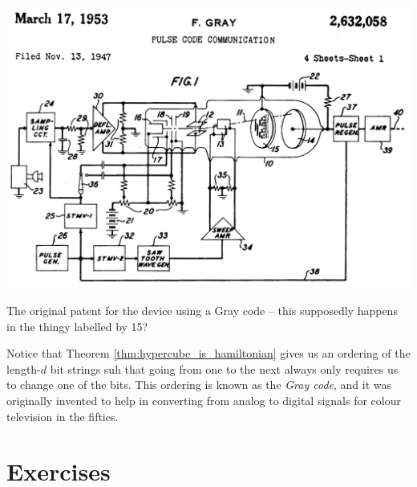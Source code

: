 \documentclass[nobib]{tufte-handout}
\begin{document}
\begin{marginfigure}
    \centering
    \includegraphics[width=1.0\textwidth]{graphics/L8_vx_covers_hamiltonicity_etc/gray_code_patent.png}
    \caption{The original patent for the device using a Gray code -- this supposedly happens in the thingy labelled by 15?}
    \label{fig:gray_code_patent}
\end{marginfigure}

\begin{remark}
    Notice that Theorem \ref{thm:hypercube_is_hamiltonian} gives us an ordering of the length-$d$ bit strings suh that going from one to the next always only requires us to change one of the bits. This ordering is known as the \emph{Gray code}, and it was originally invented to help in converting from analog to digital signals for colour television in the fifties.
\end{remark}

\section{Exercises}


%
%
\end{document}
